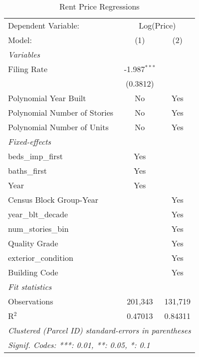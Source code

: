 \begin{table}[htbp]
   \caption{\label{tab:rent_regs} Rent Price Regressions}
   \centering
   \begin{tabular}{lcc}
      \tabularnewline \midrule \midrule
      Dependent Variable: & \multicolumn{2}{c}{Log(Price)}\\
      Model:                       & (1)            & (2)\\  
      \midrule
      \emph{Variables}\\
      Filing Rate                  & -1.987$^{***}$ &   \\   
                                   & (0.3812)       &   \\   
      Polynomial Year Built        & No             & Yes\\  
      Polynomial Number of Stories & No             & Yes\\  
      Polynomial Number of Units   & No             & Yes\\  
      \midrule
      \emph{Fixed-effects}\\
      beds\_imp\_first             & Yes            & \\  
      baths\_first                 & Yes            & \\  
      Year                         & Yes            & \\  
      Census Block Group-Year      &                & Yes\\  
      year\_blt\_decade            &                & Yes\\  
      num\_stories\_bin            &                & Yes\\  
      Quality Grade                &                & Yes\\  
      exterior\_condition          &                & Yes\\  
      Building Code                &                & Yes\\  
      \midrule
      \emph{Fit statistics}\\
      Observations                 & 201,343        & 131,719\\  
      R$^2$                        & 0.47013        & 0.84311\\  
      \midrule \midrule
      \multicolumn{3}{l}{\emph{Clustered (Parcel ID) standard-errors in parentheses}}\\
      \multicolumn{3}{l}{\emph{Signif. Codes: ***: 0.01, **: 0.05, *: 0.1}}\\
   \end{tabular}
\end{table}

